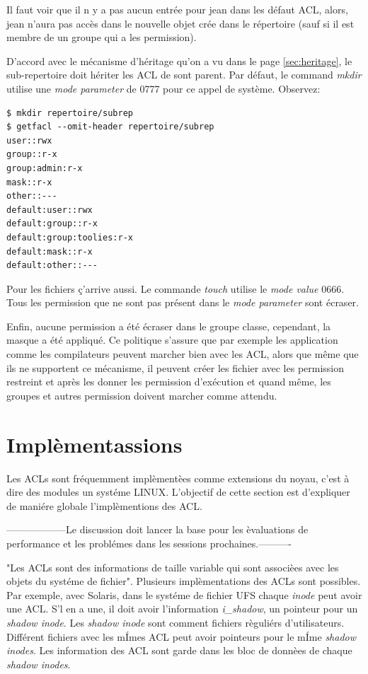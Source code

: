 Il faut voir que il n y a pas aucun entrée pour jean dans les défaut ACL, alors, jean n'aura pas accès dans le nouvelle objet crée dans le répertoire (sauf si il est membre de un groupe qui a les permission). 

D'accord avec le mécanisme d'héritage qu'on a vu dans le page \ref{sec:heritage}, le sub-repertoire doit hériter les ACL de sont parent. Par défaut, le command \emph{mkdir} utilise une \emph{mode parameter} de 0777 pour ce appel de système. Observez:

\begin{verbatim}
$ mkdir repertoire/subrep 
$ getfacl --omit-header repertoire/subrep 
user::rwx 
group::r-x 
group:admin:r-x 
mask::r-x 
other::--- 
default:user::rwx 
default:group::r-x 
default:group:toolies:r-x 
default:mask::r-x 
default:other::---
\end{verbatim}

Pour les fichiers ç'arrive aussi. Le commande \emph{touch} utilise le \emph{mode value} 0666. Tous les permission que ne sont pas présent dans le \emph{mode parameter} sont écraser.

Enfin, aucune permission a été écraser dans le groupe classe, cependant, la masque a été appliqué. Ce politique s'assure que par exemple les application comme les compilateurs peuvent marcher bien avec les ACL, alors que même que ils ne supportent ce mécanisme, il peuvent créer les fichier avec les permission restreint et après les donner les permission d'exécution et quand même, les groupes et autres permission doivent marcher comme attendu. 


\section{Implèmentassions}
 
Les ACLs sont fréquemment implèmentèes comme extensions du noyau, c'est à dire des modules un systéme LINUX. L'objectif de cette section est d'expliquer de maniére globale l'implèmentions des ACL. 

------------------Le discussion doit lancer la base pour les èvaluations de performance et les problémes dans les sessions prochaines.----------
 
"Les ACLs sont des informations de taille variable qui sont associèes avec les objets du systéme de fichier"\cite{aclsuse}. Plusieurs implèmentations des ACLs sont possibles. Par exemple, avec Solaris, dans le systéme de fichier UFS\cite{acl_permission} chaque \emph{inode} peut avoir une ACL. S'l en a une, il doit avoir l'information \emph{i\_shadow}, un pointeur pour un \emph{shadow inode}. Les \emph{shadow inode} sont comment fichiers règuliérs d'utilisateurs. Différent fichiers avec les mÍmes ACL peut avoir pointeurs pour le mÍme \emph{shadow inodes}. Les information des ACL sont garde dans les bloc de donnèes de chaque \emph{shadow inodes}.
 
